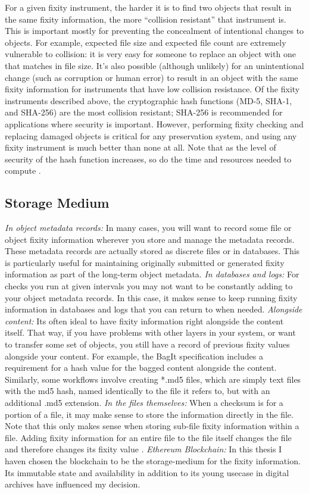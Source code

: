 For a given fixity instrument, the harder it is to find two objects that result in the same fixity information, the more “collision resistant” that instrument is. This is important mostly for preventing the concealment of intentional changes to objects. For example, expected file size and expected file count are extremely vulnerable to collision: it is very easy for someone to replace an object with one that matches in file size. It’s also possible (although unlikely) for an unintentional change (such as corruption or human error) to result in an object with the same fixity information for instruments that have low collision resistance. Of the fixity instruments described above, the cryptographic hash functions (MD-5, SHA-1, and SHA-256) are the most collision resistant; SHA-256 is recommended for applications where security is important. However, performing fixity checking and replacing damaged objects is critical for any preservation system, and using any fixity instrument is much better than none at all. Note that as the level of security of the hash function increases, so do the time and resources needed to compute \cite[7]{ndsa2014fixity}.
\subsection{Storage Medium}
\label{sec:storage-medium}
\textit{In object metadata records:} In many cases, you will want to record some file or object fixity information wherever you store and manage the metadata records. These metadata records are actually stored as discrete files or in databases. This is particularly useful for maintaining originally submitted or generated fixity information as part of the long-term object metadata. 
\textit{In databases and logs:} For checks you run at given intervals you may not want to be constantly adding to your object metadata records. In this case, it makes sense to keep running fixity information in databases and logs that you can return to when needed.
\textit{Alongside content:} Its often ideal to have fixity information right alongside the content itself. That way, if you have problems with other layers in your system, or want to transfer some set of objects, you still have a record of previous fixity values alongside your content. For example, the BagIt specification includes a requirement for a hash value for the bagged content alongside the content. Similarly, some workflows involve creating *.md5 files, which are simply text files with the md5 hash, named identically to the file it refers to, but with an additional .md5 extension.
\textit{In the files themselves:} When a checksum is for a portion of a file, it may make sense to store the information directly in the file. Note that this only makes sense when storing sub-file fixity information within a file. Adding fixity information for an entire file to the file itself changes the file and therefore changes its fixity value \cite[7]{ndsa2014fixity}.
\textit{Ethereum Blockchain:} In this thesis I haven chosen the blockchain to be the storage-medium for the fixity information. Its immutable state and availability in addition to its young usecase in digital archives have influenced my decision.
